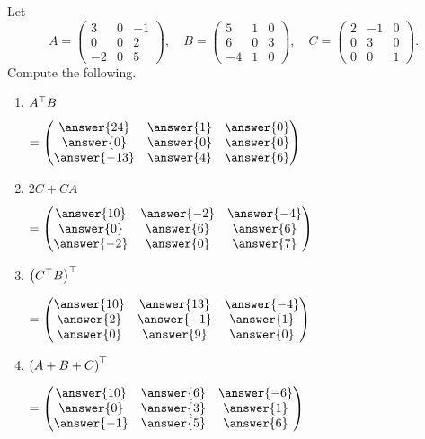 \documentclass{ximera}
\author{Parisa Fatheddin}
\begin{document}
\begin{exercise}
  Let
  \[
    A =
    \begin{pmatrix}
      3 & 0 & -1\\
      0 & 0 & 2\\
      -2 & 0 & 5
    \end{pmatrix},\quad
    B =
    \begin{pmatrix}
      5 & 1 & 0\\
      6 & 0 & 3\\
      -4 & 1 & 0
    \end{pmatrix},\quad
    C =
    \begin{pmatrix}
      2 & -1 & 0\\
      0 & 3 & 0 \\
      0 & 0 & 1
    \end{pmatrix}.
  \]
  Compute the following.
  \begin{enumerate}
  \item $A^\top B$
    \begin{prompt} $=
      \begin{pmatrix}
        \answer{24} & \answer{1} & \answer{0}\\
        \answer{0} & \answer{0} & \answer{0}\\
        \answer{-13} & \answer{4} & \answer{6}
      \end{pmatrix}$
    \end{prompt}

  \item $2C + CA$
    \begin{prompt} $=
      \begin{pmatrix}
        \answer{10} & \answer{-2} & \answer{-4}\\
        \answer{0} & \answer{6} & \answer{6}\\
        \answer{-2} & \answer{0} & \answer{7}
      \end{pmatrix}$
    \end{prompt}

  \item $\left( C^\top B  \right)^\top$
    \begin{prompt} $=
      \begin{pmatrix}
        \answer{10} & \answer{13} & \answer{-4}\\
        \answer{2} & \answer{-1} & \answer{1}\\
        \answer{0} & \answer{9} & \answer{0}
      \end{pmatrix}$
    \end{prompt}

  \item $\left(A + B + C\right)^\top $
    \begin{prompt} $=
      \begin{pmatrix}
        \answer{10} & \answer{6} & \answer{-6}\\
        \answer{0} & \answer{3} & \answer{1}\\
        \answer{-1} & \answer{5} & \answer{6}
      \end{pmatrix}$
    \end{prompt}
  \end{enumerate}
\end{exercise}
\end{document}

